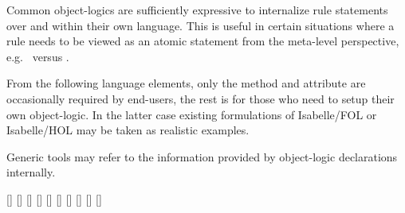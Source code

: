 \begin{isabellebody}
\begin{isamarkuptext}
  Common object-logics are sufficiently expressive to internalize rule
  statements over  and  within their own
  language.  This is useful in certain situations where a rule needs
  to be viewed as an atomic statement from the meta-level perspective,
  e.g.\  versus .

  From the following language elements, only the \hyperlink{method.atomize}{\mbox{}}
  method and \hyperlink{attribute.rule-format}{\mbox{}} attribute are occasionally
  required by end-users, the rest is for those who need to setup their
  own object-logic.  In the latter case existing formulations of
  Isabelle/FOL or Isabelle/HOL may be taken as realistic examples.

  Generic tools may refer to the information provided by object-logic
  declarations internally.

  \begin{railoutput}
[]
[]
\rail@end
{}
[]
\rail@bar
{}
[]
[]
[]
\rail@endbar
\rail@end
{}
[]
\rail@bar
{}
[]
[]
[]
\rail@endbar
\rail@end
\end{railoutput}



\end{isamarkuptext}
\end{isabellebody}
